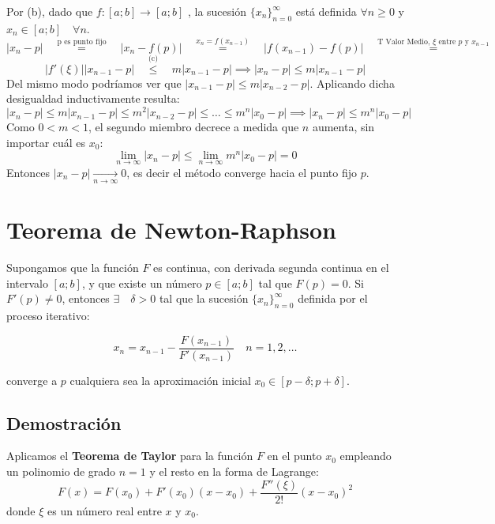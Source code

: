 \documentclass[openany]{book}
\newcommand{\equaltext}[1]{\ensuremath{\quad \stackrel{\text{#1}}{=} \quad }}
\newcommand{\leqtext}[1]{\ensuremath{\quad \stackrel{\text{#1}}{\leq} \quad }}
\begin{document}
\begin{enumerate}
  Por (b), dado que \(f:[a; b] \rightarrow [a; b]\) , la sucesión \(\{x_n\}_{n=0}^{\infty}\) está definida \(\forall n \geq 0\) y \(x_n \in [a; b] \quad \forall n\).
  \[ |x_n - p| \equaltext{p es punto fijo} |x_n - f(p)| \quad \stackrel{x_n=f(x_{n-1})}{=} \quad |f(x_{n-1}) - f(p)| \equaltext{T Valor Medio, $\xi$ entre $p$ y $x_{n-1}$}\]
  \[ |f'(\xi)| |x_{n-1} - p| \leqtext{(c)} m |x_{n-1} - p| \implies |x_n - p| \leq m |x_{n-1} - p|\]
  Del mismo modo podríamos ver que \(|x_{n-1} - p| \leq m |x_{n-2} - p|\).
  Aplicando dicha desigualdad inductivamente resulta:
  \[ |x_n - p| \leq m |x_{n-1} - p| \leq m^2 |x_{n-2} - p| \leq \dots \leq m^n |x_0 - p| \implies |x_n - p| \leq m^n |x_0 - p|\]
  Como \(0<m<1\), el segundo miembro decrece a medida que \(n\) aumenta, sin importar cuál es \(x_0\):
  \[\lim_{n \to \infty} |x_n - p| \leq \lim_{n \to \infty} m^n |x_0 - p| = 0\]
  Entonces \(|x_n - p| \xrightarrow[n \to \infty]{} 0\), es decir el método converge hacia el punto fijo \(p\).
\end{enumerate}

\hypertarget{teorema-de-newton-raphson-1}{%
\section*{Teorema de Newton-Raphson}\label{teorema-de-newton-raphson-1}}

Supongamos que la función \(F\) es continua, con derivada segunda continua en el intervalo \([a; b]\), y que existe un número \(p \in [a; b]\) tal que \(F(p) = 0\). Si \(F'(p) \neq 0\), entonces \(\exists \quad \delta > 0\) tal que la sucesión \(\{x_n\}_{n=0}^{\infty}\) definida por el proceso iterativo:

\begin{equation}
\label{reglagral}
x_n = x_{n-1} - \frac{F(x_{n-1})}{F'(x_{n-1})} \quad n=1,2,\dots
\end{equation}

converge a \(p\) cualquiera sea la aproximación inicial \(x_0 \in [p-\delta; p+\delta]\).

\hypertarget{demostraciuxf3n-1}{%
\subsection*{Demostración}\label{demostraciuxf3n-1}}

Aplicamos el \textbf{Teorema de Taylor} para la función \(F\) en el punto \(x_0\) empleando un polinomio de grado \(n=1\) y el resto en la forma de Lagrange:
\[F(x) = F(x_0) + F'(x_0)(x-x_0) + \frac{F''(\xi)}{2!}(x-x_0)^2\]
donde \(\xi\) es un número real entre \(x\) y \(x_0\).
\end{document}
